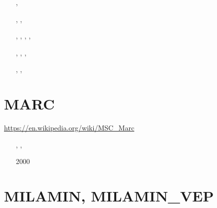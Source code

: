 \begin{small}
\begin{itemize}
\item[\twothousandtwelve]    \textcite{yatd12}
\item[\twothousandthirteen]  \textcite{yahb13}
\item[\twothousandfifteen]   \textcite{yadm15}
\item[\twothousandsixteen]   \textcite{dumy16},  \textcite{dupm16}
\item[\twothousandnineteen]  \textcite{chmd19},  \textcite{dual19},  \textcite{pedm19}
\item[\twothousandtwenty]    \textcite{poyd20},  \textcite{bedh20},  \textcite{casd20}, 
                             \textcite{chsm20},  \textcite{auwy20}
\item[\twothousandtwentyone] \textcite{pody21},  \textcite{cadm21},  \textcite{auwy21},
                             \textcite{poyd21}
\item[\twothousandtwentytwo] \textcite{auyd22},  \textcite{yadb22},  \textcite{cads22}
\item[\twothousandtwentyfour] \textcite{bayd24}
\end{itemize}
\end{small}



\section{MARC}

\url{https://en.wikipedia.org/wiki/MSC_Marc}

\begin{small}
\begin{itemize}
\item[\nineteenninetyseven] \textcite{nesg97}
\item[\nineteenninetynine]  \textcite{nesb99}, \textcite{nebc99}, \textcite{dins99}
\item[2000]  \textcite{gacn00}
\end{itemize}
\end{small}

\section{MILAMIN, MILAMIN\_VEP} 

